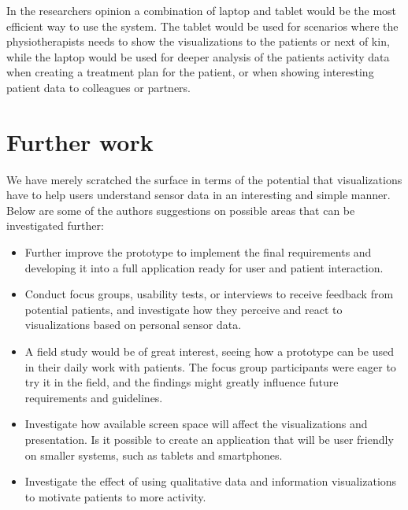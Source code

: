 In the researchers opinion a combination of laptop and tablet would be the most efficient way to use the system. The tablet would be used for scenarios where the physiotherapists needs to show the visualizations to the patients or next of kin, while the laptop would be used for deeper analysis of the patients activity data when creating a treatment plan for the patient, or when showing interesting patient data to colleagues or partners.

\section{Further work}
We have merely scratched the surface in terms of the potential that visualizations have to help users understand sensor data in an interesting and simple manner. Below are some of the authors suggestions on possible areas that can be investigated further:

\begin{itemize}
  \item Further improve the  prototype to implement the final requirements and developing it into a full application ready for user and patient interaction.
  \item Conduct focus groups, usability tests, or interviews to receive feedback from potential patients, and investigate how they perceive and react to visualizations based on personal sensor data.
  \item A field study would be of great interest, seeing how a prototype can be used in their daily work with patients. The focus group participants were eager to try it in the field, and the findings might greatly influence future requirements and guidelines.
  \item Investigate how available screen space will affect the visualizations and presentation. Is it possible to create an application that will be user friendly on smaller systems, such as tablets and smartphones.
  \item Investigate the effect of using qualitative data and information visualizations to motivate patients to more activity.
\end{itemize}


